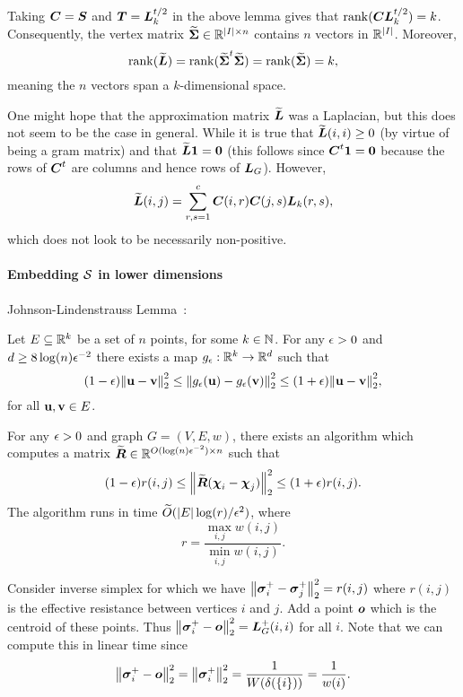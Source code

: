 Taking $\vb*{C}=\vb*{S}$ and $\vb*{T}=\vb*{L}_k^{t/2}$ in the above lemma gives that $\rank(\vb*{C}\vb*{L}_k^{t/2})=k$. Consequently, the vertex matrix $\widetilde{\boldsymbol{\Sigma}}\in\mathbb{R}^{|I|\times n}$ contains $n$ vectors in $\mathbb{R}^{|I|}$. Moreover, 
\[\rank(\widetilde{\vb*{L}}) = \rank(\widetilde{\boldsymbol{\Sigma}}^t \widetilde{\boldsymbol{\Sigma}}) = \rank(\widetilde{\boldsymbol{\Sigma}})=k,\]
meaning the $n$ vectors span a $k$-dimensional space. 

One might hope that the approximation matrix $\widetilde{\vb*{L}}$ was a Laplacian, but this does not seem to be the case in general. While it is true that $\widetilde{\vb*{L}}(i,i)\geq 0$ (by virtue of being a gram matrix) and that $\widetilde{\vb*{L}}\vb{1}=\vb{0}$ (this follows since $\vb*{C}^t\vb{1} =\vb{0}$ because the rows of $\vb*{C}^t$ are columns and hence rows of $\vb*{L}_G$). However, 
\[\widetilde{\vb*{L}}(i,j) = \sum_{r,s=1}^c \vb*{C}(i,r)\vb*{C}(j,s)\vb*{L}_k(r,s),\]
which does not look to be necessarily non-positive. 





\paragraph{Embedding \texorpdfstring{$\mathcal{S}$}{the simplex} in lower dimensions}
Johnson-Lindenstrauss Lemma~\cite{johnson1984extensions,dasgupta2003elementary}: 

\begin{theorem}
Let $E\subseteq \mathbb{R}^k$ be a set of $n$ points, for some $k\in\mathbb{N}$. For any $\epsilon>0$ and $d\geq 8\log(n)\epsilon^{-2}$ there exists a map $g_\epsilon:\mathbb{R}^k\to\mathbb{R}^d$ such that 
\begin{equation*}
    (1-\epsilon)\norm{\vb{u}-\vb{v}}_2^2 \leq \norm{g_\epsilon(\vb{u}) - g_\epsilon(\vb{v})}_2^2 \leq (1+\epsilon)\norm{\vb{u}-\vb{v}}_2^2,
\end{equation*}
for all $\vb{u},\vb{v}\in E$. 
\end{theorem}

\begin{theorem}
For any $\epsilon>0$ and graph $G=(V,E,w)$, there exists an algorithm which computes a matrix $\widetilde{\vb*{R}}\in\mathbb{R}^{O(\log(n)\epsilon^{-2})\times n}$ such that 
\begin{equation*}
    (1-\epsilon)r(i,j) \leq \norm{\widetilde{\vb*{R}}(\boldsymbol{\chi}_i-\boldsymbol{\chi}_j)}_2^2 \leq (1+\epsilon) r(i,j).
\end{equation*}
The algorithm runs in time $\widetilde{O}( |E|\log (r)/\epsilon^2)$, where 
\[r=\frac{\max_{i,j}w(i,j)}{\min_{i,j}w(i,j)}.\]
\end{theorem}

Consider inverse simplex for which we have $\norm{\vb*{\sigma}_i^+-\vb*{\sigma}_j^+}_2^2=r(i,j)$ where $r(i,j)$ is the effective resistance between vertices $i$ and $j$. Add a point $\vb*{o}$ which is the centroid of these points. Thus $\norm{\vb*{\sigma}_i^+-\vb*{o}}_2^2 = \vb*{L}_G^+(i,i)$ for all $i$. Note that we can compute this in linear time since 
\[\norm{\vb*{\sigma}_i^+-\vb*{o}}_2^2 = \norm{\vb*{\sigma}_i^+}_2^2 = \frac{1}{W(\delta(\{i\}))}=\frac{1}{w(i)}.\]

